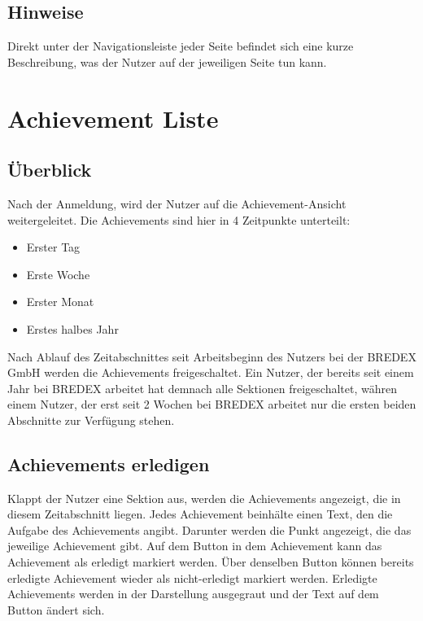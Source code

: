 \documentclass[11pt]{article}
\begin{document}
\subsection{Hinweise}
Direkt unter der Navigationsleiste jeder Seite befindet sich eine kurze Beschreibung, was der Nutzer auf der jeweiligen Seite tun kann.


\section{Achievement Liste}
\subsection{Überblick}
Nach der Anmeldung, wird der Nutzer auf die Achievement-Ansicht weitergeleitet. Die Achievements sind hier in 4 Zeitpunkte unterteilt:
\begin{itemize}
    \item Erster Tag
    \item Erste Woche
    \item Erster Monat
    \item Erstes halbes Jahr
\end{itemize}
Nach Ablauf des Zeitabschnittes seit Arbeitsbeginn des Nutzers bei der BREDEX GmbH werden die Achievements freigeschaltet. Ein Nutzer, der 
bereits seit einem Jahr bei BREDEX arbeitet hat demnach alle Sektionen freigeschaltet, währen einem Nutzer, der erst seit 2 Wochen bei BREDEX
arbeitet nur die ersten beiden Abschnitte zur Verfügung stehen.

\subsection{Achievements erledigen}
Klappt der Nutzer eine Sektion aus, werden die Achievements angezeigt, die in diesem Zeitabschnitt liegen.
Jedes Achievement beinhälte einen Text, den die Aufgabe des Achievements angibt. Darunter werden die Punkt angezeigt, die das jeweilige Achievement gibt.
Auf dem Button in dem Achievement kann das Achievement als erledigt markiert werden. Über denselben Button können bereits
erledigte Achievement wieder als nicht-erledigt markiert werden.
Erledigte Achievements werden in der Darstellung ausgegraut und der Text auf dem Button ändert sich.
\end{document}
